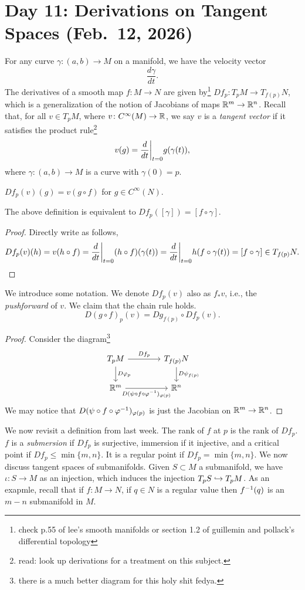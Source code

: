 \section{Day 11: Derivations on Tangent Spaces (Feb.\ 12, 2026)}
For any curve $\gamma \colon (a, b) \to M$ on a manifold, we have the velocity vector
\[ \frac{d\gamma}{dt}. \]
The derivatives of a smooth map $f \colon M \to N$ are given by\footnote{check p.55 of lee's smooth manifolds or section 1.2 of guillemin and pollack's differential topology} $Df_p \colon T_p M \to T_{f(p)} N$, which is a generalization of the notion of Jacobians of maps $\mathbb R^m \to \mathbb R^n$. Recall that, for all $v \in T_pM$, where $v \colon C^\infty(M) \to \mathbb R$, we say $v$ is a \textit{tangent vector} if it satisfies the product rule\footnote{read: look up derivations for a treatment on this subject.}
\[ v(g) = \restr{\frac{d}{dt}}{t = 0} g(\gamma(t)), \]
where $\gamma \colon (a, b) \to M$ is a curve with $\gamma(0) = p$.
\begin{definition}[\S5.11]
    $Df_p(v)(g) = v(g \circ f)$ for $g \in C^\infty(N)$.
\end{definition}
\begin{proposition}
    The above definition is equivalent to $Df_p([\gamma]) = [f \circ \gamma]$.
\end{proposition}
\begin{proof}
    Directly write as follows,
    \[ Df_p(v)(h) = v(h \circ f) = \restr{\frac{d}{dt}}{t=0} (h \circ f)(\gamma(t)) = \restr{\frac{d}{dt}}{t=0} h(f \circ \gamma(t)) = [f \circ \gamma] \in T_{f(p)}N. \qedhere \]
\end{proof}
We introduce some notation. We denote $Df_p(v)$ also as $f_\ast v$, i.e., the \textit{pushforward} of $v$. We claim that the chain rule holds.
\[ D(g \circ f)_p(v) = Dg_{f(p)} \circ Df_p (v). \]
\begin{proof}
    Consider the diagram\footnote{there is a much better diagram for this holy shit fedya.}
    \[ \begin{tikzcd}[column sep=40pt] T_p M \arrow[r, "Df_p"] \arrow[d, "D\varphi_p"] & T_{f(p)} N \arrow[d, "D \psi_{f(p)}"] \\ \RR^m \arrow[r, "D(\psi \circ f \circ \varphi\inv)_{\varphi(p)}"'] & \RR^n \end{tikzcd} \]
    We may notice that $D(\psi \circ f \circ \varphi^{-1})_{\varphi(p)}$ is just the Jacobian on $\mathbb R^m \to \mathbb R^n$.
\end{proof}
We now revisit a definition from last week. The rank of $f$ at $p$ is the rank of $Df_p$. $f$ is a \textit{submersion} if $Df_p$ is surjective, immersion if it injective, and a critical point if $Df_p \leq \min\{m, n\}$. It is a regular point if $Df_p = \min\{m, n\}$. We now discuss tangent spaces of submanifolds. Given $S \subset M$ a submanifold, we have $\iota \colon S \to M$ as an injection, which induces the injection $T_p S \hookrightarrow T_p M$. As an exapmle, recall that if $f \colon M \to N$, if $q \in N$ is a regular value then $f^{-1}(q)$ is an $m-n$ submanifold in $M$.

